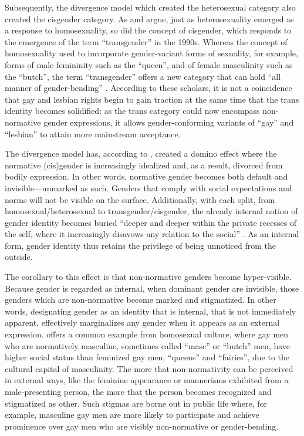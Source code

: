 \documentclass[11pt]{article}
\begin{document}
Subsequently, the divergence model which created the heterosexual category also created the cisgender category. As \citet{amin:2022} and \citet{enke:2013} argue, just as heterosexuality emerged as a response to homosexuality, so did the concept of cisgender, which responds to the emergence of the term “transgender” in the 1990s. Whereas the concept of homosexuality used to incorporate gender-variant forms of sexuality, for example, forms of male femininity such as the “queen”, and of female masculinity such as the “butch”, the term “transgender” offers a new category that can hold “all manner of gender-bending” \citep{amin:2022}. According to these scholars, it is not a coincidence that gay and lesbian rights begin to gain traction at the same time that the trans identity becomes solidified: as the trans category could now encompass non-normative gender expressions, it allows gender-conforming variants of “gay” and “lesbian” to attain more mainstream acceptance. 

The divergence model has, according to \citet{amin:2022}, created a domino effect where the normative (cis)gender is increasingly idealized and, as a result, divorced from bodily expression. In other words, normative gender becomes both default and invisible—unmarked as such. Genders that comply with social expectations and norms will not be visible on the surface. Additionally, with each split, from homosexual/heterosexual to transgender/cisgender, the already internal notion of gender identity becomes buried “deeper and deeper within the private recesses of the self, where it increasingly disavows any relation to the social” \citep{amin:2022}. As an internal form, gender identity thus retains the privilege of being unnoticed from the outside.      

The corollary to this effect is that non-normative genders become hyper-visible. Because gender is regarded as internal, when dominant gender are invisible, those genders which are non-normative become marked and stigmatized. In other words, designating gender as an identity that is internal, that is not immediately apparent, effectively marginalizes any gender when it appears as an external expression. \citet{amin:2022} offers a common example from homosexual culture, where gay men who are normatively masculine, sometimes called “masc” or “butch” men, have higher social status than feminized gay men, “queens” and “fairies”, due to the cultural capital of masculinity. The more that non-normativity can be perceived in external ways, like the feminine appearance or mannerisms exhibited from a male-presenting person, the more that the person becomes recognized and stigmatized as other. Such stigmas are borne out in public life where, for example, masculine gay men are more likely to participate and achieve prominence over gay men who are visibly non-normative or gender-bending.
\end{document}
